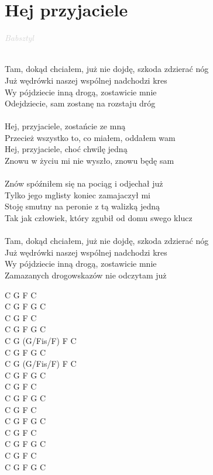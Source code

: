 \documentclass[a5paper, 10pt]{book}
\begin{document}
\section{Hej przyjaciele}\textcolor{lightgray}{\textit{Babsztyl}}\\~\\
\begin{minipage}[t]{0.75\textwidth}
Tam, dokąd chciałem, już nie dojdę, szkoda zdzierać nóg\\
Już wędrówki naszej wspólnej nadchodzi kres\\
Wy pójdziecie inną drogą, zostawicie mnie\\
Odejdziecie, sam zostanę na rozstaju dróg\\
\\
\hspace*{5mm}Hej, przyjaciele, zostańcie ze mną\\
\hspace*{5mm}Przecież wszystko to, co miałem, oddałem wam\\
\hspace*{5mm}Hej, przyjaciele, choć chwilę jedną\\
\hspace*{5mm}Znowu w życiu mi nie wyszło, znowu będę sam\\
\\
Znów spóźniłem się na pociąg i odjechał już\\
Tylko jego mglisty koniec zamajaczył mi\\
Stoję smutny na peronie z tą walizką jedną\\
Tak jak człowiek, który zgubił od domu swego klucz\\
\\
Tam, dokąd chciałem, już nie dojdę, szkoda zdzierać nóg\\
Już wędrówki naszej wspólnej nadchodzi kres\\
Wy pójdziecie inną drogą, zostawicie mnie\\
Zamazanych drogowskazów nie odczytam już\\
\end{minipage}
\begin{minipage}[t]{0.25\textwidth}
C G F C\\
C G F G C\\
C G F C\\
C G F G C\\

C G (G/Fis/F) F C\\
C G F G C\\
C G (G/Fis/F) F C\\
C G F G C\\

C G F C\\
C G F G C\\
C G F C\\
C G F G C\\

C G F C\\
C G F G C\\
C G F C\\
C G F G C\\

\end{minipage}
\end{document}
